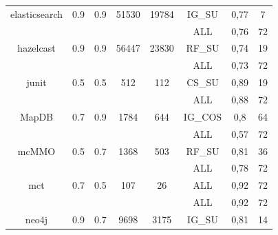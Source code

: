\begin{table}[H]
\begin{center}
{\begin{tabular}{cccccccc}
elasticsearch                  & 0.9        & 0.9           & 51530            & 19784              & IG\_SU                   & 0,77       & 7                             \\
                               &            &               &                  &                    & ALL                      & 0,76       & 72                            \\
hazelcast                      & 0.9        & 0.9           & 56447            & 23830              & RF\_SU                   & 0,74       & 19                            \\
                               &            &               &                  &                    & ALL                      & 0,73       & 72                            \\
junit                          & 0.5        & 0.5           & 512              & 112                & CS\_SU                   & 0,89       & 19                            \\
                               &            &               &                  &                    & ALL                      & 0,88       & 72                            \\
MapDB                          & 0.7        & 0.9           & 1784             & 644                & IG\_COS                  & 0,8        & 64                            \\
                               &            &               &                  &                    & ALL                      & 0,57       & 72                            \\
mcMMO                          & 0.5        & 0.7           & 1368             & 503                & RF\_SU                   & 0,81       & 36                            \\
                               &            &               &                  &                    & ALL                      & 0,78       & 72                            \\
mct                            & 0.7        & 0.5           & 107              & 26                 & ALL                      & 0,92       & 72                            \\
                               &            &               &                  &                    & ALL                      & 0,92       & 72                            \\
neo4j                          & 0.9        & 0.7           & 9698             & 3175               & IG\_SU                   & 0,81       & 14                            \\

\end{tabular}}
\end{center}
\end{table}
